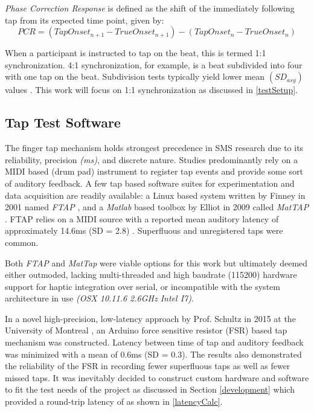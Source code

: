 \textit{Phase Correction Response} is defined as the shift of the immediately following tap from its expected time point, given by:
\begin{equation*}
    PCR = (Tap Onset_{n+1} - True Onset_{n+1})-(Tap Onset_{n} - True Onset_{n})
\end{equation*}

When a participant is instructed to tap on the beat, this is termed 1:1 synchronization. 4:1 synchronization, for example, is a beat subdivided into four with one tap on the beat. Subdivision tests typically yield lower mean $(SD_{asy})$ values \cite{repp2013sensorimotor}. This work will focus on 1:1 synchronization as discussed in \ref{testSetup}.

\subsection{Tap Test Software} \label{ttsw}
The finger tap mechanism holds strongest precedence in SMS research due to its reliability, precision \textit{(ms)}, and discrete nature. Studies predominantly rely on a MIDI based (drum pad) instrument to register tap events and provide some sort of auditory feedback. A few tap based software suites for experimentation and data acquisition are readily available: a Linux based system written by Finney in 2001 named \textit{FTAP} \cite{finney2001ftap}, and a \textit{Matlab} based toolbox by Elliot in 2009 called \textit{MatTAP} \cite{elliott2009mattap}. FTAP relies on a MIDI source with a reported mean auditory latency of approximately 14.6ms (SD = 2.8) \cite{schultz2016tap}. Superfluous and unregistered taps were common.

Both \textit{FTAP} and \textit{MatTap} were viable options for this work but ultimately deemed either outmoded, lacking multi-threaded and high baudrate (115200) hardware support for haptic integration over serial, or incompatible with the system architecture in use \textit{(OSX 10.11.6 2.6GHz Intel I7)}.

In a novel high-precision, low-latency approach by Prof. Schultz in 2015 at the University of Montreal \cite{schultz2016tap}, an Arduino force sensitive resistor (FSR) based tap mechanism was constructed. Latency between time of tap and auditory feedback was minimized with a mean of 0.6ms (SD = 0.3). The results also demonstrated the reliability of the FSR in recording fewer superfluous taps as well as fewer missed taps.
It was inevitably decided to construct custom hardware and software to fit the test needs of the project as discussed in Section \ref{development} which provided a round-trip latency of 
as shown in \ref{latencyCalc}.

